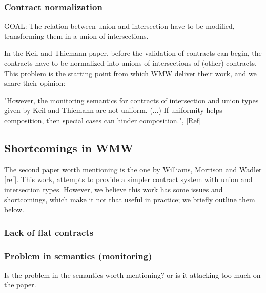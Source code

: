 
\subsubsection{Contract normalization}

GOAL: The relation between union and intersection have to be modified, transforming them
in a union of intersections.

In the Keil and Thiemann paper, before the validation of contracts can begin, the
contracts have to be normalized into unions of intersections of (other) contracts.
This problem  is the starting point from which
WMW deliver their work, and we share their opinion:

"However, the monitoring semantics for contracts of intersection and union types given by Keil
and Thiemann are not uniform. (...) If uniformity helps composition, then
special cases can hinder composition.", [Ref]

\subsection{Shortcomings in WMW}

The second paper worth mentioning is the one by Williams, Morrison and Wadler [ref].
This work, attempts to provide a simpler contract system with
union and intersection types.
However, we believe this work has some issues and shortcomings, which make it
not that useful in practice; we briefly outline them below.

\subsubsection*{Lack of flat contracts}


\subsubsection*{Problem in semantics (monitoring)}
Is the problem in the semantics worth mentioning? or is it attacking too much on the paper.
